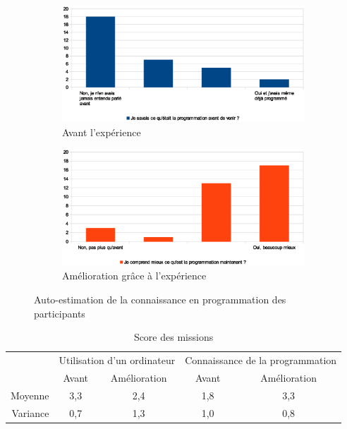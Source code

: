 \begin{figure}
  \begin{center}
    \begin{subfigure}[b]{\textwidth}
      \begin{center}
        \includegraphics[width=\textwidth]{content/8-validation/images/prog-avant}
        \caption{Avant l'expérience}
      \end{center}
    \end{subfigure}
    \begin{subfigure}[b]{\textwidth}
      \begin{center}
        \includegraphics[width=\textwidth]{content/8-validation/images/prog-apres}
        \caption{Amélioration grâce à l'expérience}
      \end{center}
    \end{subfigure}
    \caption{Auto-estimation de la connaissance en programmation des participants}
    \label{fig:niveau-prog}
  \end{center}
\end{figure}

\begin{table}
  \begin{center}
    \begin{tabular}{r|cc|cc}
               & \multicolumn{2}{c|}{Utilisation d'un ordinateur} & \multicolumn{2}{c}{Connaissance de la programmation} \\
               & Avant & Amélioration                             & Avant & Amélioration \\ \hline
      Moyenne  & 3,3 & 2,4 & 1,8 & 3,3 \\
      Variance & 0,7 & 1,3 & 1,0 & 0,8 \\
    \end{tabular}
  \end{center}
  \caption{Score des missions}
  \label{tab:form-info}
\end{table}

